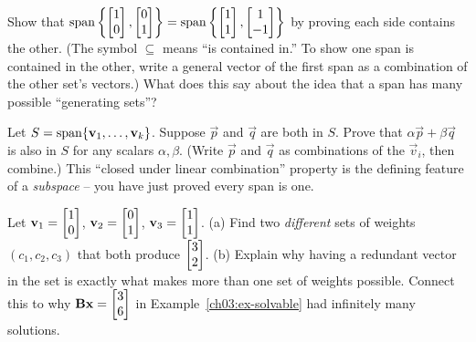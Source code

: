 \begin{exercise}\label{ch03:ex-same-span}
Show that $\operatorname{span}\left\{\begin{bmatrix}1\\0\end{bmatrix},\begin{bmatrix}0\\1\end{bmatrix}\right\} = \operatorname{span}\left\{\begin{bmatrix}1\\1\end{bmatrix},\begin{bmatrix}1\\-1\end{bmatrix}\right\}$ by proving each side contains the other. (The symbol $\subseteq$ means ``is contained in.'' To show one span is contained in the other, write a general vector of the first span as a combination of the other set's vectors.) What does this say about the idea that a span has many possible ``generating sets''?
\end{exercise}

\begin{exercise}\label{ch03:ex-closed}
Let $S = \operatorname{span}\{\mathbf{v}_1,\dots,\mathbf{v}_k\}$. Suppose $\vec{p}$ and $\vec{q}$ are both in $S$. Prove that $\alpha\vec{p} + \beta\vec{q}$ is also in $S$ for any scalars $\alpha,\beta$. (Write $\vec{p}$ and $\vec{q}$ as combinations of the $\vec{v}_i$, then combine.) This ``closed under linear combination'' property is the defining feature of a \emph{subspace} -- you have just proved every span is one.
\end{exercise}

\begin{exercise}\label{ch03:ex-challenge}
Let $\mathbf{v}_1 = \begin{bmatrix}1\\0\end{bmatrix}$, $\mathbf{v}_2 = \begin{bmatrix}0\\1\end{bmatrix}$, $\mathbf{v}_3 = \begin{bmatrix}1\\1\end{bmatrix}$.
(a) Find two \emph{different} sets of weights $(c_1,c_2,c_3)$ that both produce $\begin{bmatrix}3\\2\end{bmatrix}$.
(b) Explain why having a redundant vector in the set is exactly what makes more than one set of weights possible. Connect this to why $\mathbf{B}\mathbf{x}=\begin{bmatrix}3\\6\end{bmatrix}$ in Example~\ref{ch03:ex-solvable} had infinitely many solutions.
\end{exercise}
